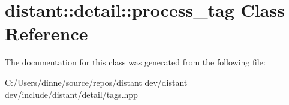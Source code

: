 \hypertarget{classdistant_1_1detail_1_1process__tag}{}\section{distant\+:\+:detail\+:\+:process\+\_\+tag Class Reference}
\label{classdistant_1_1detail_1_1process__tag}


The documentation for this class was generated from the following file\+:\begin{DoxyCompactItemize}
\item 
C\+:/\+Users/dinne/source/repos/distant dev/distant dev/include/distant/detail/tags.\+hpp\end{DoxyCompactItemize}
